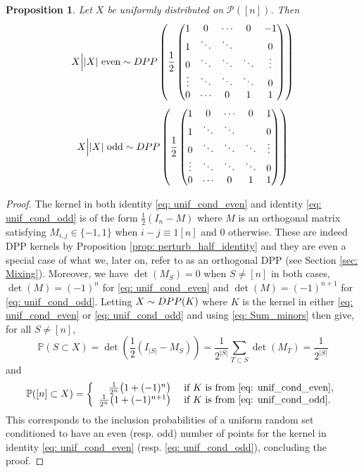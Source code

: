 \documentclass{article}
\numberwithin{equation}{section}
\newcommand{\bP}{\mathbb{P}}
\newcommand{\cP}{\mathcal{P}}
\newcommand{\DPP}{\textnormal{DPP}}
\theoremstyle{plain}
\newtheorem{proposition}{Proposition}[section]
\begin{document}
\begin{proposition}
Let $X$ be uniformly distributed on $\cP([n])$. Then
\begin{equation}\label{eq: unif_cond_even}
X{\Big |} |X|~\mbox{even}\sim\DPP\left(\frac 1 2\begin{pmatrix} 1 & 0 & \cdots & 0 & -1\\
1 & \ddots & \ddots & & 0\\
0 & \ddots & \ddots & \ddots & \vdots\\
\vdots & \ddots & \ddots & \ddots & 0\\
0 & \cdots & 0 & 1 & 1
\end{pmatrix}\right)
\end{equation}
\begin{equation}\label{eq: unif_cond_odd}
X{\Big |} |X|~\mbox{odd}\sim\DPP\left(\frac 1 2\begin{pmatrix} 1 & 0 & \cdots & 0 & 1\\
1 & \ddots & \ddots & & 0\\
0 & \ddots & \ddots & \ddots & \vdots\\
\vdots & \ddots & \ddots & \ddots & 0\\
0 & \cdots & 0 & 1 & 1
\end{pmatrix}\right)
\end{equation}
\end{proposition} 
\begin{proof}
The kernel in both identity \eqref{eq: unif_cond_even} and identity \eqref{eq: unif_cond_odd} is of the form $\frac{1}{2}(I_n - M)$ where $M$ is an orthogonal matrix satisfying $M_{i, j} \in \{-1, 1\}$ when $i - j \equiv 1 [n]$ and $0$ otherwise. These are indeed DPP kernels by Proposition \ref{prop: perturb_half_identity} and they are even a special case of what we, later on, refer to as an orthogonal DPP (see Section \ref{sec: Mixing}). Moreover, we have $\det(M_S)=0$ when $S\neq [n]$ in both cases, $\det(M)=(-1)^n$ for \eqref{eq: unif_cond_even} and $\det(M)=(-1)^{n + 1}$ for \eqref{eq: unif_cond_odd}. Letting $X\sim\DPP(K)$ where $K$ is the kernel in either \eqref{eq: unif_cond_even} or \eqref{eq: unif_cond_odd} and using \eqref{eq: Sum_minors} then give, for all $S\neq [n]$,
\[\bP(S\subset X) = \det\left(\frac{1}{2}(I_{|S|} - M_S)\right)=\frac{1}{2^{|S|}}\sum_{T\subset S}\det(M_T) = \frac{1}{2^{|S|}}\]
and
\[\bP([n]\subset X) = \left\{\begin{array}{rl} \frac{1}{2^n}\big(1 + (-1)^n\big)~&\mbox{if}~K~\mbox{is from}~\eqref{eq: unif_cond_even},\\
\frac{1}{2^n}\big(1 + (-1)^{n + 1}\big)~&\mbox{if}~K~\mbox{is from}~\eqref{eq: unif_cond_odd}.
\end{array}\right.\]
This corresponds to the inclusion probabilities of a uniform random set conditioned to have an even (resp. odd) number of points for the kernel in identity \eqref{eq: unif_cond_even} (resp. \eqref{eq: unif_cond_odd}), concluding the proof.
\end{proof}
\end{document}
